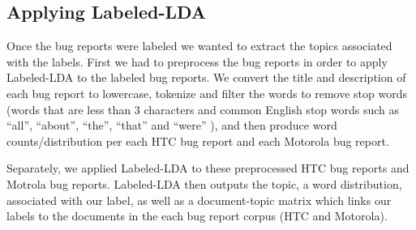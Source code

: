 \documentclass[10pt, conference, compsocconf]{IEEEtran}
\begin{document}
\subsection{Applying Labeled-LDA}





Once the bug reports were labeled we wanted to extract the topics
associated with the labels. First we had to preprocess the bug reports 
in order to apply Labeled-LDA to the labeled bug reports. 
We convert the title and description of each bug report to lowercase,
tokenize and filter the words to remove stop words (words that are less than 3 characters and
common English stop words such as ``all'', ``about'', ``the'',
``that'' and ``were'' ), and then produce word counts/distribution per
each HTC bug report and each Motorola bug report.

Separately, we applied Labeled-LDA to these preprocessed HTC bug reports and Motrola bug reports.
Labeled-LDA then outputs the topic, a word distribution, associated
with our label, as well as a document-topic matrix which links our
labels to the documents in the each bug report corpus (HTC and
Motorola).
\end{document}
